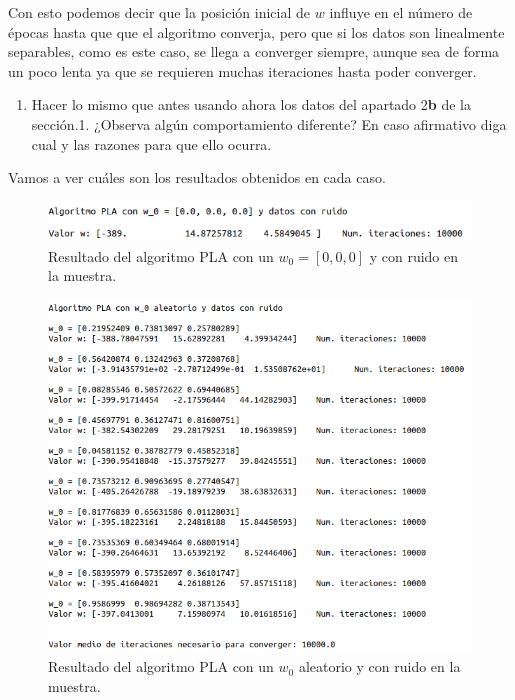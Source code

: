 \documentclass[11pt,a4paper]{article}
\begin{document}
Con esto podemos decir que la posición inicial de $w$ influye en el número de épocas hasta que
que el algoritmo converja, pero que si los datos son linealmente separables, como es este caso,
se llega a converger siempre, aunque sea de forma un poco lenta ya que se requieren muchas iteraciones
hasta poder converger.

\begin{enumerate}[resume,label=\textit{\alph*})]
	\item Hacer lo mismo que antes usando ahora los datos del apartado 2\textbf{b} de la sección.1.
	¿Observa algún comportamiento diferente? En caso afirmativo diga cual y las razones para que ello
	ocurra.
\end{enumerate}

Vamos a ver cuáles son los resultados obtenidos en cada caso.

\begin{figure}[H]
\centering
\includegraphics[scale=0.6]{img/pla_0_noise.png}
\caption{Resultado del algoritmo PLA con un $w_0 = [0, 0, 0]$ y con ruido en la muestra.}
\end{figure}

\begin{figure}[H]
\centering
\includegraphics[scale=0.55]{img/pla_rand_noise.png}
\caption{Resultado del algoritmo PLA con un $w_0$ aleatorio y con ruido en la muestra.}
\end{figure}
\end{document}

